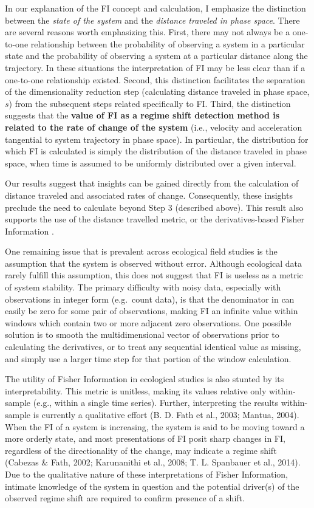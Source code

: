 \documentclass[12pt,twoside,openany]{reedthesis}
\begin{document}
In our explanation of the FI concept and calculation, I emphasize the
distinction between the \emph{state of the system} and the
\emph{distance traveled in phase space}. There are several reasons worth
emphasizing this. First, there may not always be a one-to-one
relationship between the probability of observing a system in a
particular state and the probability of observing a system at a
particular distance along the trajectory. In these situations the
interpretation of FI may be less clear than if a one-to-one relationship
existed. Second, this distinction facilitates the separation of the
dimensionality reduction step (calculating distance traveled in phase
space, \(s\)) from the subsequent steps related specifically to FI.
Third, the distinction suggests that the \textbf{value of FI as a regime
shift detection method is related to the rate of change of the system}
(i.e., velocity and acceleration tangential to system trajectory in
phase space). In particular, the distribution for which FI is calculated
is simply the distribution of the distance traveled in phase space, when
time is assumed to be uniformly distributed over a given interval.

Our results suggest that insights can be gained directly from the
calculation of distance traveled and associated rates of change.
Consequently, these insights preclude the need to calculate beyond Step
3 (described above). This result also supports the use of the distance
travelled metric, or the derivatives-based Fisher Information
\label{eq:fiDerivs}.

One remaining issue that is prevalent across ecological field studies is
the assumption that the system is observed without error. Although
ecological data rarely fulfill this assumption, this does not suggest
that FI is useless as a metric of system stability. The primary
difficulty with noisy data, especially with observations in integer form
(e.g.~count data), is that the denominator in can easily be zero for
some pair of observations, making FI an infinite value within windows
which contain two or more adjacent zero observations. One possible
solution is to smooth the multidimensional vector of observations prior
to calculating the derivatives, or to treat any sequential identical
value as missing, and simply use a larger time step for that portion of
the window calculation.

The utility of Fisher Information in ecological studies is also stunted
by its interpretability. This metric is unitless, making its values
relative only within-sample (e.g., within a single time series).
Further, interpreting the results within-sample is currently a
qualitative effort (B. D. Fath et al., 2003; Mantua, 2004). When the FI
of a system is increasing, the system is said to be moving toward a more
orderly state, and most presentations of FI posit sharp changes in FI,
regardless of the directionality of the change, may indicate a regime
shift (Cabezas \& Fath, 2002; Karunanithi et al., 2008; T. L. Spanbauer
et al., 2014). Due to the qualitative nature of these interpretations of
Fisher Information, intimate knowledge of the system in question and the
potential driver(s) of the observed regime shift are required to confirm
presence of a shift.
\end{document}
